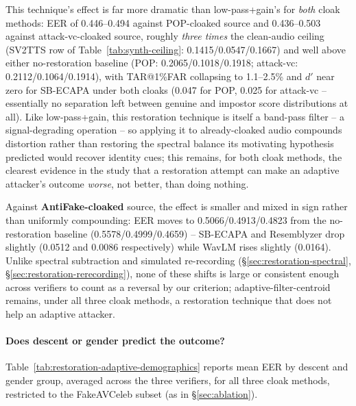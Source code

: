 \documentclass[11pt]{article}
\begin{document}
This technique's effect is far more dramatic than low-pass+gain's for
\emph{both} cloak methods: EER of 0.446--0.494 against POP-cloaked
source and 0.436--0.503 against attack-vc-cloaked source, roughly
\emph{three times} the clean-audio ceiling (SV2TTS row of
Table~\ref{tab:synth-ceiling}: 0.1415/0.0547/0.1667) and well above
either no-restoration baseline (POP: 0.2065/0.1018/0.1918; attack-vc:
0.2112/0.1064/0.1914), with TAR@1\%FAR collapsing to 1.1--2.5\% and
$d'$ near zero for SB-ECAPA under both cloaks (0.047 for POP, 0.025 for
attack-vc -- essentially no separation left between genuine and
impostor score distributions at all). Like low-pass+gain, this
restoration technique is itself a band-pass filter -- a
signal-degrading operation -- so applying it to already-cloaked audio
compounds distortion rather than restoring the spectral balance its
motivating hypothesis predicted would recover identity cues; this
remains, for both cloak methods, the clearest evidence in the study
that a restoration attempt can make an adaptive attacker's outcome
\emph{worse}, not better, than doing nothing.

Against \textbf{AntiFake-cloaked} source, the effect is smaller and
mixed in sign rather than uniformly compounding: EER moves to
0.5066/0.4913/0.4823 from the no-restoration baseline
(0.5578/0.4999/0.4659) -- SB-ECAPA and Resemblyzer drop slightly
(0.0512 and 0.0086 respectively) while WavLM rises slightly (0.0164).
Unlike spectral subtraction and simulated re-recording
(\S\ref{sec:restoration-spectral}, \S\ref{sec:restoration-rerecording}),
none of these shifts is large or consistent enough across verifiers to
count as a reversal by our criterion; adaptive-filter-centroid remains,
under all three cloak methods, a restoration technique that does not
help an adaptive attacker.

\paragraph{Does descent or gender predict the outcome?}
Table~\ref{tab:restoration-adaptive-demographics} reports mean EER by
descent and gender group, averaged across the three verifiers, for
all three cloak methods, restricted to the FakeAVCeleb subset (as in
\S\ref{sec:ablation}).
\end{document}
